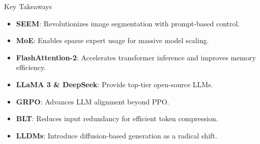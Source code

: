 \begin{frame}{Key Takeaways}
    \begin{itemize}
        \item \textbf{SEEM}: Revolutionizes image segmentation with prompt-based control.
        \item \textbf{MoE}: Enables sparse expert usage for massive model scaling.
        \item \textbf{FlashAttention-2}: Accelerates transformer inference and improves memory efficiency.
        \item \textbf{LLaMA 3 \& DeepSeek}: Provide top-tier open-source LLMs.
        \item \textbf{GRPO}: Advances LLM alignment beyond PPO.
        \item \textbf{BLT}: Reduces input redundancy for efficient token compression.
        \item \textbf{LLDMs}: Introduce diffusion-based generation as a radical shift.
    \end{itemize}
\end{frame}
